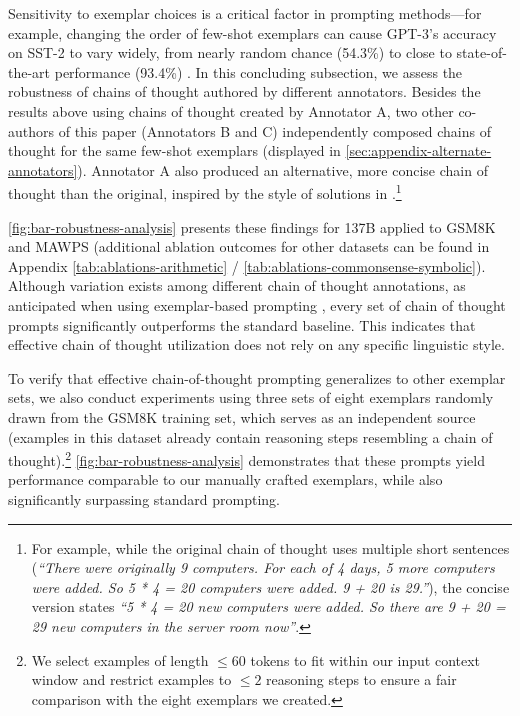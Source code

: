 Sensitivity to exemplar choices is a critical factor in prompting methods—for example, changing the order of few-shot exemplars can cause GPT-3’s accuracy on SST-2 to vary widely, from nearly random chance (54.3\%) to close to state-of-the-art performance (93.4\%) \citep{zhao2021calibrate}. In this concluding subsection, we assess the robustness of chains of thought authored by different annotators. Besides the results above using chains of thought created by Annotator A, two other co-authors of this paper (Annotators B and C) independently composed chains of thought for the same few-shot exemplars (displayed in \cref{sec:appendix-alternate-annotators}). Annotator A also produced an alternative, more concise chain of thought than the original, inspired by the style of solutions in \citet{cobbe2021training}.\footnote{For example, while the original chain of thought uses multiple short sentences (\textit{``There were originally 9 computers. For each of 4 days, 5 more computers were added. So 5 * 4 = 20 computers were added. 9 + 20 is 29.''}), the concise version states \textit{``5 * 4 = 20 new computers were added. So there are 9 + 20 = 29 new computers in the server room now''}.}

\cref{fig:bar-robustness-analysis} presents these findings for \lamda{} 137B applied to GSM8K and MAWPS (additional ablation outcomes for other datasets can be found in Appendix \cref{tab:ablations-arithmetic} / \cref{tab:ablations-commonsense-symbolic}). Although variation exists among different chain of thought annotations, as anticipated when using exemplar-based prompting \citep{le-scao-rush-2021-many,reynolds2021prompt,zhao2021calibrate}, every set of chain of thought prompts significantly outperforms the standard baseline. This indicates that effective chain of thought utilization does not rely on any specific linguistic style.

To verify that effective chain-of-thought prompting generalizes to other exemplar sets, we also conduct experiments using three sets of eight exemplars randomly drawn from the GSM8K training set, which serves as an independent source (examples in this dataset already contain reasoning steps resembling a chain of thought).\footnote{We select examples of length $\leq 60$ tokens to fit within our input context window and restrict examples to $\leq 2$ reasoning steps to ensure a fair comparison with the eight exemplars we created.} \cref{fig:bar-robustness-analysis} demonstrates that these prompts yield performance comparable to our manually crafted exemplars, while also significantly surpassing standard prompting.

